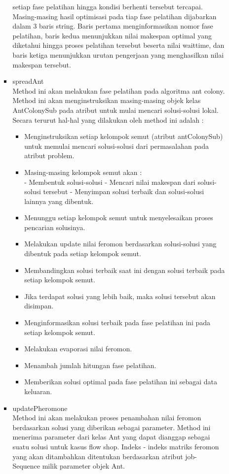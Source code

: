 \begin{itemize}
\begin{itemize}
\begin{itemize}
				setiap fase pelatihan hingga kondisi berhenti tersebut tercapai. Masing-masing hasil
				optimisasi pada tiap fase pelatihan dijabarkan dalam 3 baris string. Baris pertama
				menginformasikan nomor fase pelatihan, baris kedua menunjukkan nilai makespan
				optimal yang diketahui hingga proses pelatihan tersebut beserta nilai waittime, dan 
				baris ketiga menunjukkan urutan pengerjaan yang menghasilkan nilai makespan tersebut.
				\item spreadAnt \\
				Method ini akan melakukan fase pelatihan pada algoritma ant colony. Method ini
				akan menginstruksikan masing-masing objek kelas AntColonySub pada atribut untuk
				mulai mencari solusi-solusi lokal. Secara terurut hal-hal yang dilakukan oleh method
				ini adalah :
				\begin{itemize}
					\item Menginstruksikan setiap kelompok semut (atribut antColonySub) untuk memulai
					mencari solusi-solusi dari permasalahan pada atribut problem.
					\item Masing-masing kelompok semut akan :\\
					- Membentuk solusi-solusi - Mencari nilai makespan dari solusi-solusi tersebut -
					Menyimpan solusi terbaik dan solusi-solusi lainnya yang dibentuk.
					\item Menunggu setiap kelompok semut untuk menyelesaikan proses pencarian solusinya.
					\item Melakukan update nilai feromon berdasarkan solusi-solusi yang dibentuk pada
					setiap kelompok semut.
					\item Membandingkan solusi terbaik saat ini dengan solusi terbaik pada setiap kelompok
					semut.
					\item Jika terdapat solusi yang lebih baik, maka solusi tersebut akan disimpan.
					\item Menginformasikan solusi terbaik pada fase pelatihan ini pada setiap kelompok
					semut.
					\item Melakukan evaporasi nilai feromon.
					\item Menambah jumlah hitungan fase pelatihan.
					\item Memberikan solusi optimal pada fase pelatihan ini sebagai data keluaran.
				\end{itemize}
				\item updatePheromone \\
				Method ini akan melakukan proses penambahan nilai feromon berdasarkan solusi
				yang diberikan sebagai parameter. Method ini menerima parameter dari kelas
				Ant yang dapat dianggap sebagai suatu solusi untuk kasus flow shop. Indeks - indeks
				matriks feromon yang akan ditambahkan ditentukan berdasarkan atribut job-
				Sequence milik parameter objek Ant.
				

\end{itemize}
\end{itemize}
\end{itemize}

